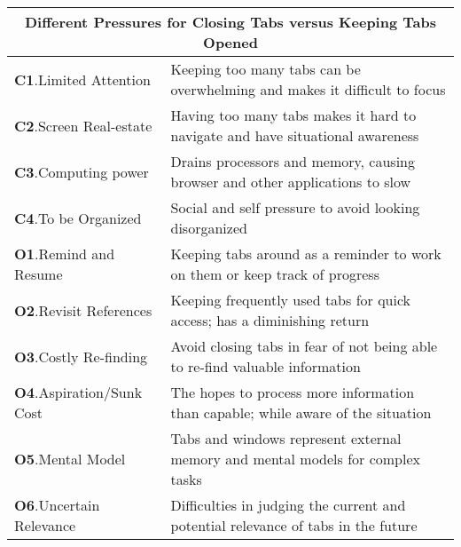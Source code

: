   \def\arraystretch{1.1}
  
  \begin{tabular}{l p{11.6cm}}
  
  \hline
  \multicolumn{2}{c}{Different Pressures for Closing Tabs versus Keeping Tabs Opened} \\
  \hline
  
    \textbf{C1}.Limited Attention &
    Keeping too many tabs can be overwhelming and makes it difficult to focus \\
    
    \textbf{C2}.Screen Real-estate &
    Having too many tabs makes it hard to navigate and have situational awareness \\
    
    \textbf{C3}.Computing power &
    Drains processors and memory, causing browser and other applications to slow \\
    
    \textbf{C4}.To be Organized &
    Social and self pressure to avoid looking disorganized \\
    
    \hline
    
    \textbf{O1}.Remind and Resume &
    Keeping tabs around as a reminder to work on them or keep track of progress \\

    \textbf{O2}.Revisit References &
    Keeping frequently used tabs for quick access; has a diminishing return \\
    
    \textbf{O3}.Costly Re-finding &
    Avoid closing tabs in fear of not being able to re-find valuable information \\
    
    \textbf{O4}.Aspiration/Sunk Cost  &
    The hopes to process more information than capable; while aware of the situation \\
    
    \textbf{O5}.Mental Model &
    Tabs and windows represent external memory and mental models for complex tasks \\
    
    \textbf{O6}.Uncertain Relevance &
    Difficulties in judging the current and potential relevance of tabs in the future \\
    
    \hline

  \end{tabular}
